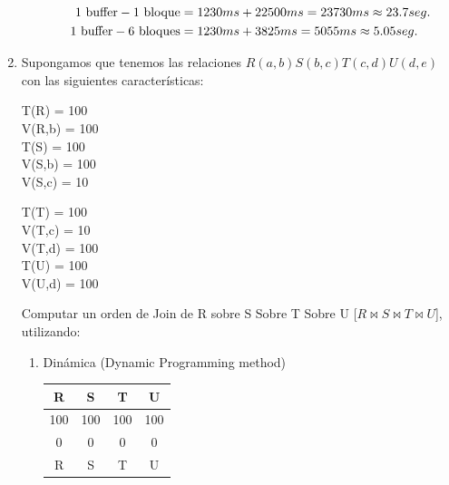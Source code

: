 \documentclass{templateNote}
\begin{document}
\begin{enumerate}
\begin{enumerate}[label=\alph*)]
        \begin{align*}
            1 \textnormal{ buffer} - 1 \textnormal{ bloque} &= 1230 ms + 22500 ms = 23730 ms \approx 23.7 seg.\\ %
            1 \textnormal{ buffer} - 6 \textnormal{ bloques} &= 1230 ms + 3825 ms = 5055 ms \approx 5.05 seg.\\ %
        \end{align*}
    \end{enumerate}

    \newpage
    \item Supongamos que tenemos las relaciones $R(a,b) S(b,c) T(c,d) U(d,e)$ con las siguientes características:\\
        
        \begin{center}
            \begin{minipage}{0.3\textwidth}
                T(R) = 100 \\
                V(R,b) = 100 \\
                T(S) = 100 \\
                V(S,b) = 100 \\
                V(S,c) = 10 \\
                \end{minipage}%
                \begin{minipage}{0.3\textwidth}
                T(T) = 100 \\
                V(T,c) = 10 \\
                V(T,d) = 100 \\
                T(U) = 100 \\
                V(U,d) = 100 \\
            \end{minipage}
        \end{center}    

        \noindent Computar un orden de Join de R sobre S Sobre T Sobre U [$R \Join S \Join T \Join U$], utilizando:

        \begin{enumerate}[label=\alph*)]
            \item Dinámica (Dynamic Programming method) \\
            
                \begin{center}
                    \begin{tabular}{|c|c|c|c|}
                        \hline
                        R & S & T & U \\
                        \hline
                        100 & 100 & 100 & 100 \\
                        \hline
                        0 & 0 & 0 & 0 \\
                        \hline
                        R & S & T & U \\
                        \hline
                    \end{tabular}
                \end{center}


\end{enumerate}
\end{enumerate}
\end{document}

